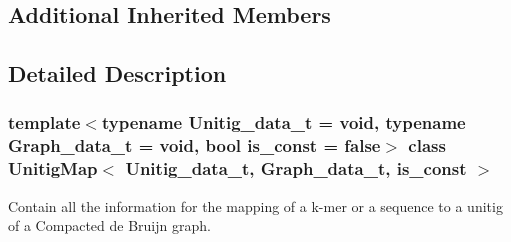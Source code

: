 \subsection*{Additional Inherited Members}


\subsection{Detailed Description}
\subsubsection*{template$<$typename Unitig\+\_\+data\+\_\+t = void, typename Graph\+\_\+data\+\_\+t = void, bool is\+\_\+const = false$>$\newline
class Unitig\+Map$<$ Unitig\+\_\+data\+\_\+t, Graph\+\_\+data\+\_\+t, is\+\_\+const $>$}

Contain all the information for the mapping of a k-\/mer or a sequence to a unitig of a Compacted de Bruijn graph. 

